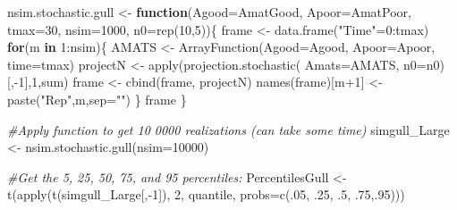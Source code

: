 \documentclass[
]{book}
\newenvironment{Shaded}{\begin{snugshade}}{\end{snugshade}}
\newcommand{\AttributeTok}[1]{\textcolor[rgb]{0.77,0.63,0.00}{#1}}
\newcommand{\CommentTok}[1]{\textcolor[rgb]{0.56,0.35,0.01}{\textit{#1}}}
\newcommand{\ControlFlowTok}[1]{\textcolor[rgb]{0.13,0.29,0.53}{\textbf{#1}}}
\newcommand{\DecValTok}[1]{\textcolor[rgb]{0.00,0.00,0.81}{#1}}
\newcommand{\FunctionTok}[1]{\textcolor[rgb]{0.00,0.00,0.00}{#1}}
\newcommand{\NormalTok}[1]{#1}
\newcommand{\OtherTok}[1]{\textcolor[rgb]{0.56,0.35,0.01}{#1}}
\newcommand{\SpecialCharTok}[1]{\textcolor[rgb]{0.00,0.00,0.00}{#1}}
\newcommand{\StringTok}[1]{\textcolor[rgb]{0.31,0.60,0.02}{#1}}
\begin{document}
\begin{Shaded}
\begin{Highlighting}[]
\NormalTok{nsim.stochastic.gull }\OtherTok{\textless{}{-}} \ControlFlowTok{function}\NormalTok{(}\AttributeTok{Agood=}\NormalTok{AmatGood, }
                                 \AttributeTok{Apoor=}\NormalTok{AmatPoor, }
                                 \AttributeTok{tmax=}\DecValTok{30}\NormalTok{, }
                                 \AttributeTok{nsim=}\DecValTok{1000}\NormalTok{,}
                                 \AttributeTok{n0=}\FunctionTok{rep}\NormalTok{(}\DecValTok{10}\NormalTok{,}\DecValTok{5}\NormalTok{))\{}
\NormalTok{  frame }\OtherTok{\textless{}{-}}  \FunctionTok{data.frame}\NormalTok{(}\StringTok{"Time"}\OtherTok{=}\DecValTok{0}\SpecialCharTok{:}\NormalTok{tmax)}
  \ControlFlowTok{for}\NormalTok{(m }\ControlFlowTok{in} \DecValTok{1}\SpecialCharTok{:}\NormalTok{nsim)\{}
\NormalTok{    AMATS }\OtherTok{\textless{}{-}} \FunctionTok{ArrayFunction}\NormalTok{(}\AttributeTok{Agood=}\NormalTok{Agood, }
                           \AttributeTok{Apoor=}\NormalTok{Apoor,}
                           \AttributeTok{time=}\NormalTok{tmax)}
\NormalTok{    projectN }\OtherTok{\textless{}{-}} \FunctionTok{apply}\NormalTok{(}\FunctionTok{projection.stochastic}\NormalTok{(}
      \AttributeTok{Amats=}\NormalTok{AMATS,  }\AttributeTok{n0=}\NormalTok{n0)[,}\SpecialCharTok{{-}}\DecValTok{1}\NormalTok{],}\DecValTok{1}\NormalTok{,sum)}
\NormalTok{    frame }\OtherTok{\textless{}{-}} \FunctionTok{cbind}\NormalTok{(frame, projectN)}
     \FunctionTok{names}\NormalTok{(frame)[m}\SpecialCharTok{+}\DecValTok{1}\NormalTok{] }\OtherTok{\textless{}{-}} \FunctionTok{paste}\NormalTok{(}\StringTok{"Rep"}\NormalTok{,m,}\AttributeTok{sep=}\StringTok{""}\NormalTok{)}
\NormalTok{  \}}
\NormalTok{  frame}
\NormalTok{\}}

\CommentTok{\#Apply function to get 10 0000 realizations (can take some time)}
\NormalTok{simgull\_Large }\OtherTok{\textless{}{-}} \FunctionTok{nsim.stochastic.gull}\NormalTok{(}\AttributeTok{nsim=}\DecValTok{10000}\NormalTok{)}

\CommentTok{\#Get the 5, 25, 50, 75, and 95 percentiles:}
\NormalTok{PercentilesGull  }\OtherTok{\textless{}{-}} \FunctionTok{t}\NormalTok{(}\FunctionTok{apply}\NormalTok{(}\FunctionTok{t}\NormalTok{(simgull\_Large[,}\SpecialCharTok{{-}}\DecValTok{1}\NormalTok{]),}
                            \DecValTok{2}\NormalTok{, }
\NormalTok{                            quantile, }
                            \AttributeTok{probs=}\FunctionTok{c}\NormalTok{(.}\DecValTok{05}\NormalTok{, .}\DecValTok{25}\NormalTok{, .}\DecValTok{5}\NormalTok{, .}\DecValTok{75}\NormalTok{,.}\DecValTok{95}\NormalTok{)))}


\end{Highlighting}
\end{Shaded}
\end{document}
